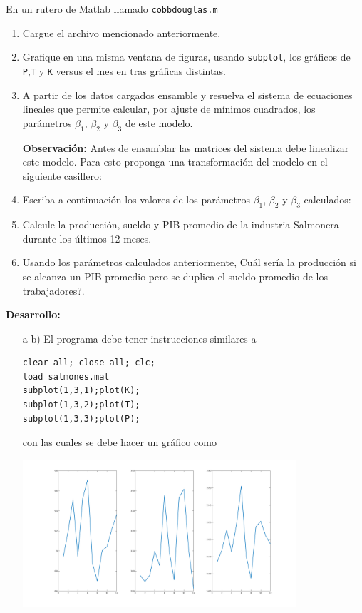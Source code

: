 \documentclass[letter,11pt]{article}
\newcommand{\matlab}{{\sc Matlab} }
\newcommand{\respuesta}[1]{
\noindent\makebox[\textwidth][r]{
\fbox{
\begin{minipage}{\textwidth}
\hfill
\vspace{#1}
\end{minipage}
}}}
\begin{document}
\begin{enumerate}
En un rutero de \matlab llamado \texttt{cobbdouglas.m}
\begin{enumerate}
\item Cargue el archivo mencionado anteriormente.
\item Grafique en una misma ventana de figuras, usando \texttt{subplot}, los gr\'aficos de \texttt{P},\texttt{T} y \texttt{K} versus el mes en tras gr\'aficas distintas.
\item A partir de los datos cargados ensamble y resuelva el sistema de ecuaciones lineales que permite calcular, por ajuste de m\'inimos cuadrados, los par\'ametros $\beta_1$, $\beta_2$ y $\beta_3$ de este modelo.

\textbf{Observaci\'on:} Antes de ensamblar las matrices del sistema debe linealizar este modelo. Para esto proponga una transformaci\'on del modelo en el siguiente casillero:

\respuesta{5cm}
\item Escriba a continuaci\'on los valores de los par\'ametros $\beta_1$, $\beta_2$ y $\beta_3$ calculados:

\respuesta{1cm}
\item Calcule la producci\'on, sueldo y PIB promedio de la industria Salmonera durante los \'ultimos 12 meses.
\item Usando los par\'ametros calculados anteriormente, \textquestiondown Cu\'al ser\'ia la producci\'on si se alcanza un PIB promedio pero se duplica el sueldo promedio de los trabajadores?.

\respuesta{1cm}
\end{enumerate}
\textbf{Desarrollo:} 
\begin{enumerate}
\item[a-b)] El programa debe tener instrucciones similares a
\begin{lstlisting}
clear all; close all; clc;
load salmones.mat
subplot(1,3,1);plot(K);
subplot(1,3,2);plot(T);
subplot(1,3,3);plot(P);
\end{lstlisting}
con las cuales se debe hacer un gr\'afico como
\begin{center}
\includegraphics[width=0.8\textwidth]{./cobb-douglas.png}
\end{center}


\end{enumerate}
\end{enumerate}
\end{document}
